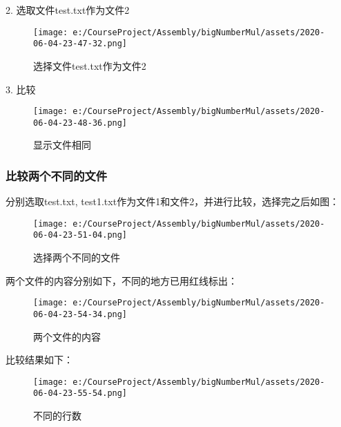 2. 选取文件test.txt作为文件2
\begin{figure}[H]
    \centering
    \texttt{[image: e:/CourseProject/Assembly/bigNumberMul/assets/2020-06-04-23-47-32.png]}
    \caption{选择文件test.txt作为文件2}
    \label{选择文件test.txt作为文件2}
\end{figure}

3. 比较
\begin{figure}[H]
    \centering
    \texttt{[image: e:/CourseProject/Assembly/bigNumberMul/assets/2020-06-04-23-48-36.png]}
    \caption{显示文件相同}
    \label{显示文件相同}
\end{figure}

\subsubsection{比较两个不同的文件}

分别选取test.txt, test1.txt作为文件1和文件2，并进行比较，选择完之后如图：
\begin{figure}[H]
    \centering
    \texttt{[image: e:/CourseProject/Assembly/bigNumberMul/assets/2020-06-04-23-51-04.png]}
    \caption{选择两个不同的文件}
    \label{选择两个不同的文件}
\end{figure}

两个文件的内容分别如下，不同的地方已用红线标出：
\begin{figure}[H]
    \centering
    \texttt{[image: e:/CourseProject/Assembly/bigNumberMul/assets/2020-06-04-23-54-34.png]}
    \caption{两个文件的内容}
    \label{两个文件的内容}
\end{figure}


比较结果如下：
\begin{figure}[H]
    \centering
    \texttt{[image: e:/CourseProject/Assembly/bigNumberMul/assets/2020-06-04-23-55-54.png]}
    \caption{不同的行数}
    \label{不同的行数}
\end{figure}

